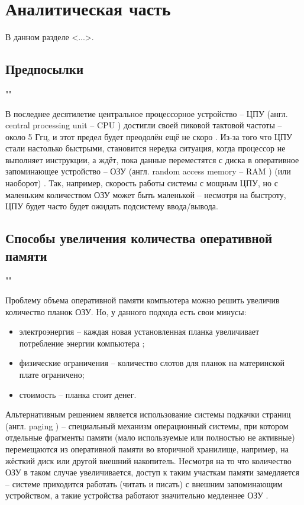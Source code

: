 \section{Аналитическая часть}

В данном разделе <...>. \\

\subsection{Предпосылки}\label{prerequisites}""

В последнее десятилетие центральное процессорное устройство -- ЦПУ (англ. central processing unit -- CPU \cite{cpu})  достигли своей пиковой тактовой частоты -- около 5 Ггц, и этот предел будет преодолён ещё не скоро \cite{cpu_pick}. Из-за того что ЦПУ стали настолько быстрыми, становится нередка ситуация, когда процессор не выполняет инструкции, а ждёт, пока данные переместятся с диска в оперативное запоминающее устройство -- ОЗУ (англ. random access memory -- RAM \cite{ram}) (или наоборот) \cite{in-kernel-memory-compression}. Так, например, скорость работы системы с мощным ЦПУ, но с маленьким количеством ОЗУ может быть маленькой -- несмотря на быстроту, ЦПУ будет часто будет ожидать подсистему ввода/вывода.\\

\subsection{Способы увеличения количества оперативной памяти}""

Проблему объема оперативной памяти компьютера можно решить увеличив количество планок ОЗУ. Но, у данного подхода есть свои минусы:

\begin{itemize}
	\item электроэнергия -- каждая новая установленная планка увеличивает потребление энергии компьютера \cite{increasing-ram-bad};
	\item физические ограничения -- количество слотов для планок на материнской плате ограничено;
	\item стоимость -- планка стоит денег.
\end{itemize}

Альтернативным решением является использование системы подкачки страниц (англ. paging \cite{paging}) -- специальный механизм операционный системы, при котором отдельные фрагменты памяти (мало используемые или полностью не активные) перемещаются из оперативной памяти во вторичной хранилище, например, на жёсткий диск или другой внешний накопитель. Несмотря на то что количество ОЗУ в таком случае увеличивается, доступ к таким участкам памяти замедляется -- системе приходится работать (читать и писать) с внешним запоминающим устройством, а такие устройства работают значительно медленнее ОЗУ \cite{ssd-hdd-speed}.

